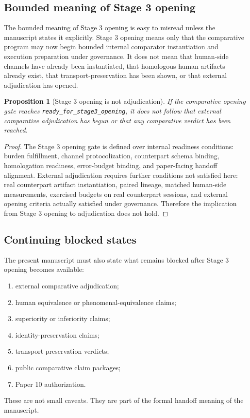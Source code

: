 \documentclass[11pt,a4paper]{article}
\newtheorem{proposition}[theorem]{Proposition}
\theoremstyle{definition}
\begin{document}
\subsection{Bounded meaning of Stage 3 opening}
The bounded meaning of Stage 3 opening is easy to misread unless the manuscript states it explicitly. Stage 3 opening means only that the comparative program may now begin bounded internal comparator instantiation and execution preparation under governance. It does not mean that human-side channels have already been instantiated, that homologous human artifacts already exist, that transport-preservation has been shown, or that external adjudication has opened.

\begin{proposition}[Stage 3 opening is not adjudication]
If the comparative opening gate reaches \texttt{ready\_for\_stage3\_opening}, it does not follow that external comparative adjudication has begun or that any comparative verdict has been reached.
\end{proposition}

\begin{proof}
The Stage 3 opening gate is defined over internal readiness conditions: burden fulfillment, channel protocolization, counterpart schema binding, homologation readiness, error-budget binding, and paper-facing handoff alignment. External adjudication requires further conditions not satisfied here: real counterpart artifact instantiation, paired lineage, matched human-side measurements, exercised budgets on real counterpart sessions, and external opening criteria actually satisfied under governance. Therefore the implication from Stage 3 opening to adjudication does not hold.
\end{proof}

\subsection{Continuing blocked states}
The present manuscript must also state what remains blocked after Stage 3 opening becomes available:
\begin{enumerate}[leftmargin=1.5em]
\item external comparative adjudication;
\item human equivalence or phenomenal-equivalence claims;
\item superiority or inferiority claims;
\item identity-preservation claims;
\item transport-preservation verdicts;
\item public comparative claim packages;
\item Paper 10 authorization.
\end{enumerate}
These are not small caveats. They are part of the formal handoff meaning of the manuscript.
\end{document}
